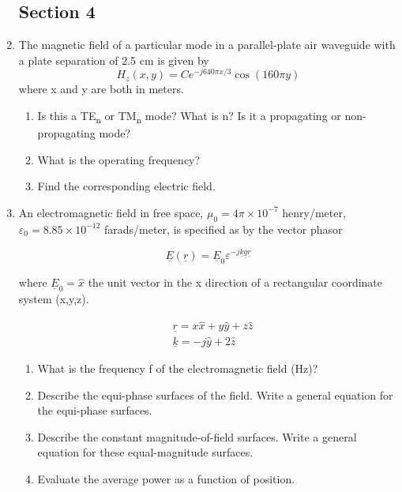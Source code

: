\documentclass[main.tex]{subfiles}
\begin{document}
\begin{enumerate}

\subsection{Section 4}

\item The magnetic field of a particular mode in a parallel-plate air waveguide with a plate separation of 2.5 cm is given by
$$H_{z}(x, y)=C e^{-j 640 \pi x / 3} \cos (160 \pi y)$$
where x and y are both in meters.
    
    \begin{enumerate}
        \item Is this a TE\textsubscript{n} or TM\textsubscript{n} mode? What is n? Is it a propagating or non-propagating mode?
        \item What is the operating frequency?
        \item Find the corresponding electric field.
    \end{enumerate}
    
\item An electromagnetic field in free space, $\mu_{0}=4 \pi \times 10^{-7}$ henry/meter, $\varepsilon_0 = 8.85 \times 10^{-12}$ farads/meter, is specified as by the vector phasor 

$$\underline{E}(\underline{r})=\underline{E}_{0} \varepsilon^{-j \underline{k} \underline{g} \underline{r}}$$

where $\underline{E}_{0}=\hat{x}$ the unit vector in the x direction of a rectangular coordinate system (x,y,z).

$$\begin{aligned}
&\underline{r}=x \hat{x}+y \hat{y}+z \hat{z} \\
&\underline{k}=-j \hat{y}+2 \hat{z}
\end{aligned}$$

    \begin{enumerate}
        \item What is the frequency f of the electromagnetic field (Hz)?
        \item Describe the equi-phase surfaces of the field. Write a general equation for the equi-phase surfaces.
        \item Describe the constant magnitude-of-field surfaces. Write a general equation for these equal-magnitude surfaces.
        \item Evaluate the average power as a function of position.
    \end{enumerate}


\end{enumerate}
\end{document}
